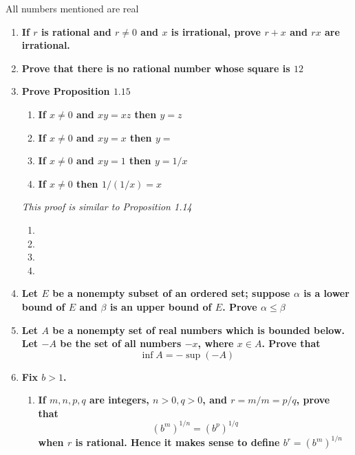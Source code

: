 \documentclass[Main.tex]{subfiles}
\begin{document}
All numbers mentioned are real

\begin{enumerate}
    \item \textbf{If $r$ is rational and $r\not = 0$ and $x$ is irrational, prove $r+x$ and $rx$ are irrational.}
    
        
    
    \item \textbf{Prove that there is no rational number whose square is $12$}
    
        
    
    \item \textbf{Prove Proposition $1.15$}
    \begin{enumerate}
        \item \textbf{If $x\not = 0$ and $xy=xz$ then $y=z$}
        \item \textbf{If $x\not = 0$ and $xy=x$ then $y=$}
        \item \textbf{If $x\not = 0$ and $xy=1$ then $y=1/x$}
        \item \textbf{If $x\not = 0$ then $1/(1/x)=x$}
    \end{enumerate}
    \textit{This proof is similar to Proposition 1.14}
    
    \begin{enumerate}
        \item 
        \item
        \item
        \item
    \end{enumerate}
    
    \item \textbf{Let $E$ be a nonempty subset of an ordered set; suppose $\alpha$ is a lower bound of $E$ and $\beta$ is an upper bound of $E$. Prove $\alpha\leq\beta$}
    
        
    
    \item \textbf{Let $A$ be a nonempty set of real numbers which is bounded below. Let $-A$ be the set of all numbers $-x$, where $x\in A$. Prove that}
    $$\inf A = -\sup(-A)$$
    
        
    
    \item \textbf{Fix $b > 1$.}
    \begin{enumerate}
        \item \textbf{If $m,n,p,q$ are integers, $n>0,q>0$, and $r=m/m=p/q$, prove that}
        $$(b^m)^{1/n}=(b^p)^{1/q}$$
        \textbf{when $r$ is rational. Hence it makes sense to define $b^r=(b^m)^{1/n}$}
        

\end{enumerate}
\end{enumerate}
\end{document}
